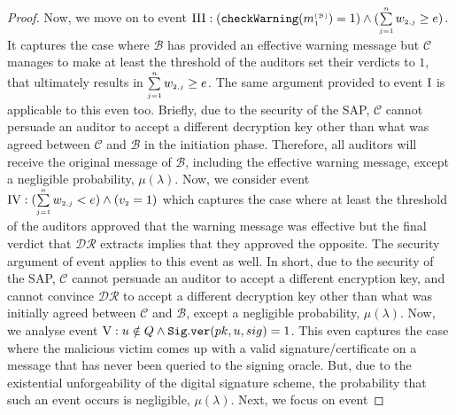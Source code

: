 \begin{proof}
 
 Now, we move on to event   $\text{\MakeUppercase{\romannumeral 3}}: (\mathtt{checkWarning}(m^{\st\mathcal{(B)}}_{\st1})= 1) \wedge (\sum\limits_{\st j=1}^{\st n}w_{\st 2,j}\geq {e})$. It captures the case where $\mathcal{B}$ has provided an effective warning message but $\mathcal{C}$ manages to make at least the threshold of the auditors  set their verdicts to $1$, that ultimately results in $\sum\limits_{\scriptscriptstyle j=1}^{\scriptscriptstyle n}w_{\scriptscriptstyle 2,j}\geq e$. The same argument provided to event $\text{\MakeUppercase{\romannumeral 1}}$ is applicable to this even too. Briefly, due to the security of the SAP, $\mathcal{C}$ cannot persuade an auditor to accept a different decryption key other than what was agreed between $\mathcal{C}$ and $\mathcal{B}$ in the initiation phase. Therefore, all auditors will receive the original message of $\mathcal{B}$, including the effective warning message, except a negligible probability, $\mu(\lambda)$. Now, we consider  event $\text{\MakeUppercase{\romannumeral 4}}:  (\sum\limits_{\st j=1}^{\st n}w_{\st 2,j}< {e}) \wedge ({v}_{\st 2}=1)$ which captures the case where at least the threshold of the auditors  approved that the warning message was effective but   the final verdict that $\mathcal{DR}$ extracts implies that they approved the opposite. The security argument of  event  applies to this event as well. In short, due to the security of the SAP, $\mathcal{C}$ cannot persuade  an auditor to accept a different encryption key, and cannot convince $\mathcal{DR}$ to accept a different decryption key other than what was initially agreed between $\mathcal{C}$ and $\mathcal{B}$, except a negligible probability, $\mu(\lambda)$. 
  Now, we analyse event  $\text{\MakeUppercase{\romannumeral 5}}: u\notin Q \wedge\mathtt{Sig.ver}( pk, u, sig) =1$. This even captures the case where the malicious victim comes up with a valid signature/certificate on a message that has never been queried to the signing oracle.  But, due to the existential unforgeability of the digital signature scheme, the probability that such an event occurs is negligible, $\mu(\lambda)$. Next, we focus on event

\end{proof}
